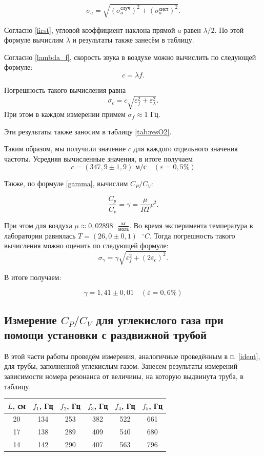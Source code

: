 \documentclass[a4paper,12pt]{article}
\theoremstyle{definition}
\begin{document}
	\begin{equation}\label{mnk:full_sigma}
		\sigma_a=\sqrt{\left(\sigma^\text{случ}_a\right)^2+\left(\sigma^\text{сист}_a\right)^2}.
	\end{equation}
	

	Согласно \eqref{first}, угловой коэффициент наклона прямой $ a $ равен $ \lambda/2 $. По этой формуле вычислим $ \lambda $ и результаты также занесём в таблицу.
	
	Согласно \eqref{lambda_f}, скорость звука в воздухе можно вычислить по следующей формуле: 
	\[ c = \lambda f. \]
	
	Погрешность такого вычисления равна \[ \sigma_c=c\sqrt{\varepsilon_f^2+\varepsilon_\lambda^2}. \] При этом в каждом измерении примем $ \sigma_f \approx 1 $ Гц.
	
	Эти результаты также заносим в таблицу \ref{tab:resO2}.
	
	Таким образом, мы получили значение $ c $ для каждого отдельного значения частоты. Усредняя вычисленные значения, в итоге получаем \[\boxed{ c = (347,9 \pm 1,9) \text{ м/с}}\quad (\varepsilon=0,5\%) \]
	
	Также, по формуле \eqref{gamma}, вычислим $ C_P/C_V $:
	
	\[ \frac{C_p}{C_v} = \gamma = \frac{\mu}{RT}c^2. \]
	
	При этом для воздуха $ \displaystyle \mu \approx 0,02898 \text{ } \frac{\text{кг}}{\text{моль}} $. Во время эксперимента температура в лаборатории равнялась $ T = (26,0 \pm 0,1) \text{ } ^\circ C $. Тогда погрешность такого вычисления можно оценить по следующей формуле:
	\[ \sigma_\gamma = \gamma\sqrt{\varepsilon_f^2+\left(2\varepsilon_c\right)^2}.\]
	
	В итоге получаем:
	
	\[ \boxed{\gamma = 1,41 \pm 0,01}\quad (\varepsilon=0,6\%) \]
	
	\subsection{Измерение $ C_P/C_V $ для углекислого газа при помощи установки с раздвижной трубой}
	
	В этой части работы проведём измерения, аналогичные проведённым в п. \ref{ident}, для трубы, заполненной углекислым газом. Занесем результаты измерений зависимости номера резонанса от величины, на которую выдвинута труба, в таблицу.

	\begin{table}[H]
		\centering
		\begin{tabular}{|c|c|c|c|c|c|}
		\hline
		$L$, см & $f_1$, Гц & $f_2$, Гц & $f_3$, Гц & $f_4$, Гц & $f_5$, Гц \\ \hline
		20      & 134       & 253       & 382       & 522       & 661       \\ \hline
		17      & 138       & 289       & 409       & 540       & 680       \\ \hline
		14      & 142       & 290       & 407       & 563       & 796       \\ \hline
		\end{tabular}
		\end{table}
\end{document}
